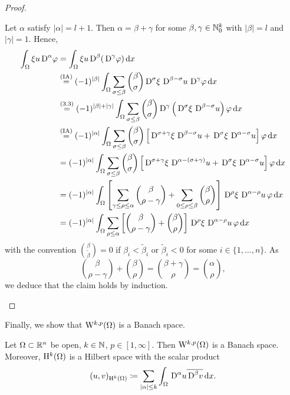 \begin{proof}
\begin{enumerate}
      Let $\alpha$ satisfy $|\alpha| = l+1$.
      Then $\alpha  = \beta + \gamma$ for some $\beta, \gamma \in \mathbb{N}_0^k$ with $|\beta| = l$ and $|\gamma| = 1$.
      Hence,
      \begin{align*}
        \int_\Omega \xi u \,{\operatorname{D}}^\alpha \varphi
        &= \int_\Omega \xi u\,{\operatorname{D}}^\beta (\,{\operatorname{D}}^\gamma \varphi ) \, {\operatorname{d}\!{x}} \\
        &\overset{\mathrm{(IA)}}{=} (-1)^{|\beta|} \int_\Omega \sum_{\sigma \leq \beta} \binom{\beta}{\sigma} \,{\operatorname{D}}^\sigma \xi\, \,{\operatorname{D}}^{\beta - \sigma} u\, \,{\operatorname{D}}^\gamma \varphi \, {\operatorname{d}\!{x}} \\
        &\overset{(3.3)}{=} (-1)^{|\beta|+|\gamma|} \int_\Omega \sum_{\sigma \leq \beta} \binom{\beta}{\sigma} \,{\operatorname{D}}^\gamma \left( \,{\operatorname{D}}^\sigma \xi \, \,{\operatorname{D}}^{\beta - \sigma} u \right) \varphi \, {\operatorname{d}\!{x}} \\
        &\overset{\mathrm{(IA)}}{=} (-1)^{|\alpha|} \int_\Omega \sum_{\sigma \leq \beta} \binom{\beta}{\sigma} \left[ \,{\operatorname{D}}^{\sigma + \gamma} \xi\, \,{\operatorname{D}}^{\beta - \sigma} u + \,{\operatorname{D}}^\sigma \xi \,\,{\operatorname{D}}^{\alpha - \sigma} u \right] \varphi \, {\operatorname{d}\!{x}}\\
        &= (-1)^{|\alpha|} \int_\Omega \sum_{\sigma \leq \beta} \binom{\beta}{\sigma} \left[ \,{\operatorname{D}}^{\sigma + \gamma} \xi\, \,{\operatorname{D}}^{\alpha - (\sigma + \gamma)} u + \,{\operatorname{D}}^\sigma \xi \,\,{\operatorname{D}}^{\alpha - \sigma} u \right] \varphi \, {\operatorname{d}\!{x}}\\
        &= (-1)^{|\alpha|} \int_\Omega \left [\sum_{\gamma \leq \rho \leq \alpha} \binom{\beta}{\rho - \gamma} + \sum_{0 \leq \rho \leq \beta} \binom{\beta}{\rho} \right] \,{\operatorname{D}}^\rho \xi \,\,{\operatorname{D}}^{\alpha - \rho}u \, \varphi \, {\operatorname{d}\!{x}} \\
        &= (-1)^{|\alpha|} \int_\Omega \sum_{\rho \leq \alpha} \left[ \binom{\beta}{\rho - \gamma} + \binom{\beta }{\rho}\right] \,{\operatorname{D}}^\rho \xi \, \,{\operatorname{D}}^{\alpha - \rho} u \, \varphi \, {\operatorname{d}\!{x}}
      \end{align*}
      with the convention $\binom{\beta}{\tilde\beta} = 0$ if $\beta_i < \tilde \beta_i$ or $\tilde \beta_i < 0$ for some $i \in \{1,\dots,n\}$.
      As $$\binom{\beta}{\rho - \gamma} + \binom{\beta}{\rho} = \binom{\beta + \gamma}{\rho} = \binom{\alpha}{\rho},$$ we deduce that the claim holds by induction.\qedhere
  \end{enumerate}
\end{proof}

Finally, we show that $\mathrm{W}^{k,p}(\Omega)$ is a Banach space.

\begin{thm}
  Let $\Omega \subset \mathbb{R}^n$ be open, $k \in \mathbb{N}$, $p \in [1,\infty]$.
  Then $\mathrm{W}^{k,p}(\Omega)$ is a Banach space.
  Moreover, $\mathrm{H}^k(\Omega)$ is a Hilbert space with the scalar product
  $$
  (u,v)_{\mathrm{H}^k(\Omega)} \coloneqq \sum_{|\alpha| \leq k} \int_\Omega \,{\operatorname{D}}^\alpha u \overline{\,{\operatorname{D}}^\beta v} \, {\operatorname{d}\!{x}}.
  $$
\end{thm}

